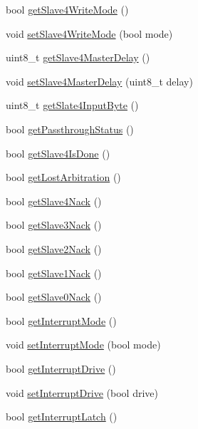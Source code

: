 \begin{DoxyCompactItemize}
\item 
bool \mbox{\hyperlink{classMPU6050_a8d5a5e73907c78960154b92656127372}{get\+Slave4\+Write\+Mode}} ()
\item 
void \mbox{\hyperlink{classMPU6050_af1402fe7f3e1cc0dedb6714351cbca4e}{set\+Slave4\+Write\+Mode}} (bool mode)
\item 
uint8\+\_\+t \mbox{\hyperlink{classMPU6050_a9a4585b3c9e61478db198011107a56a9}{get\+Slave4\+Master\+Delay}} ()
\item 
void \mbox{\hyperlink{classMPU6050_ac154934a43c599cdc564fb29c22c45eb}{set\+Slave4\+Master\+Delay}} (uint8\+\_\+t delay)
\item 
uint8\+\_\+t \mbox{\hyperlink{classMPU6050_a9bc93f34bc3d85cbe6010b4a3a88c5a7}{get\+Slate4\+Input\+Byte}} ()
\item 
bool \mbox{\hyperlink{classMPU6050_af2820067b73f177d985ed81e894281b0}{get\+Passthrough\+Status}} ()
\item 
bool \mbox{\hyperlink{classMPU6050_a105aefe645e7021f9ba4397e9df4114c}{get\+Slave4\+Is\+Done}} ()
\item 
bool \mbox{\hyperlink{classMPU6050_acd775c72f85dabfc6f8fba43da096c6d}{get\+Lost\+Arbitration}} ()
\item 
bool \mbox{\hyperlink{classMPU6050_ae9882b425cbdced4de325b608d896e10}{get\+Slave4\+Nack}} ()
\item 
bool \mbox{\hyperlink{classMPU6050_a55f24d2f2b13d6e28a7c8b6bf2913520}{get\+Slave3\+Nack}} ()
\item 
bool \mbox{\hyperlink{classMPU6050_af4b5101dab501d6df2e0cae909120771}{get\+Slave2\+Nack}} ()
\item 
bool \mbox{\hyperlink{classMPU6050_a65cc9d75ff347b146414685fb83fa451}{get\+Slave1\+Nack}} ()
\item 
bool \mbox{\hyperlink{classMPU6050_a74511edfcada3fb21c3327a0c846c72a}{get\+Slave0\+Nack}} ()
\item 
bool \mbox{\hyperlink{classMPU6050_a58da1dfb39eb34e3a09a9b0bf4d87f29}{get\+Interrupt\+Mode}} ()
\item 
void \mbox{\hyperlink{classMPU6050_a003a098a1521c5ef4df50c0a8a2d47ab}{set\+Interrupt\+Mode}} (bool mode)
\item 
bool \mbox{\hyperlink{classMPU6050_af66e6c7b1885dcf452e73371790fddfd}{get\+Interrupt\+Drive}} ()
\item 
void \mbox{\hyperlink{classMPU6050_a9d9d6aeea346e6f6fad8e4a428cf3301}{set\+Interrupt\+Drive}} (bool drive)
\item 
bool \mbox{\hyperlink{classMPU6050_a5502c4c2a9bc4ea9267e128b7743923d}{get\+Interrupt\+Latch}} ()

\end{DoxyCompactItemize}
